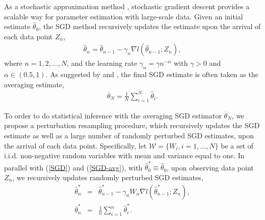 \documentclass[12pt]{article}
\def\wh{\widehat}
\def\ol{\overline}
\begin{document}
As a stochastic approximation method \citep{robbins1951stochastic}, stochastic gradient descent provides a scalable way for parameter estimation with large-scale data. Given an initial estimate $\wh{\theta}_0$, the SGD method recursively updates the estimate upon the arrival of each data point $Z_n$,
\begin{eqnarray}\label{SGD}
\wh{\theta}_n=\wh{\theta}_{n-1}-\gamma_n\nabla l(\wh{\theta}_{n-1}; Z_n),
\end{eqnarray}
where $n=1, 2, \dots, N$, and the learning rate $\gamma_n=\gamma n^{-\alpha}$ with $\gamma>0$ and $\alpha\in (0.5, 1)$. As suggested by \cite{ruppert1988efficient} and \cite{polyak1992acceleration}, the final SGD estimate is often taken as the averaging estimate,
\begin{eqnarray}\label{SGD-avg}
\ol{\theta}_N=\frac{1}{N}\sum_{i=1}^N\wh{\theta}_i.
\end{eqnarray}

To order to do statistical inference with the averaging SGD estimator $\ol{\theta}_N$, we propose a perturbation resampling procedure, which recursively updates the SGD estimate as well as a large number of randomly perturbed SGD estimates, upon the arrival of each data point. Specifically, let $\mathcal{W} = \{W_i, i = 1, \dots, N\}$ be a set of i.i.d. non-negative random variables with mean and variance equal to one. In parallel with (\ref{SGD}) and (\ref{SGD-avg}), with $\wh{\theta}^*_0\equiv \wh{\theta}_0$, upon observing data point $Z_n$, we recursively updates randomly perturbed SGD estimates,
\begin{eqnarray}
\wh{\theta}^*_n&=&\wh{\theta}^*_{n-1}-\gamma_nW_n\nabla l(\wh{\theta}^*_{n-1}; Z_n),\label{SGD-wt}\\
\ol{\theta}^*_n&=&\frac{1}{n}\sum_{i=1}^n\wh{\theta}^*_i.\label{SGD-avg-wt}
\end{eqnarray}
\end{document}
